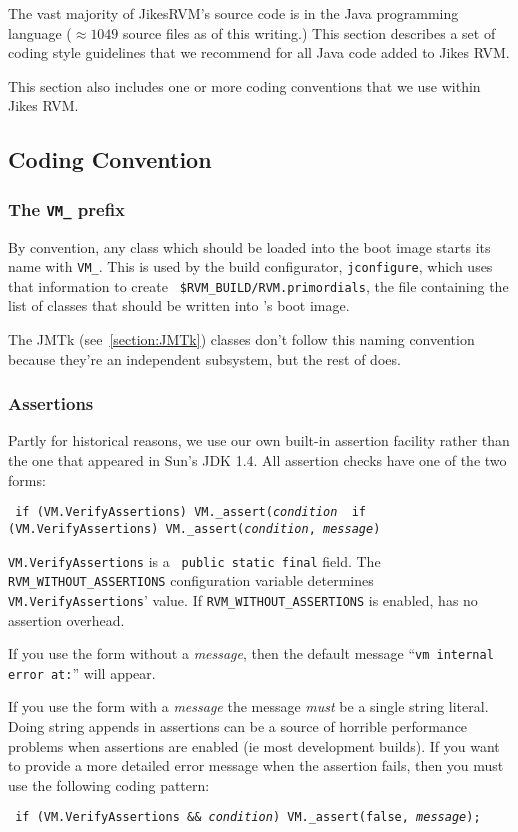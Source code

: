 The vast majority of Jikes\TMweb RVM's source code is in the Java\TMweb
programming language ($\approx 1049$
source files as of this writing.)  This section describes a set of
coding style guidelines that we recommend for all Java code added to
Jikes RVM.

This section also includes one or more coding conventions that we
use within Jikes RVM.  

\subsection{Coding Convention}

\subsubsection{The {\tt VM\_} prefix}

By convention, any class which should be loaded into the boot image
starts its name with {\tt VM\_}.  This is used by the build configurator,
{\tt jconfigure}, which uses that information to create {\tt
\$RVM\_BUILD/RVM.primordials}, the file containing the list of classes
that should be written into \jrvm{}'s  boot image.

The JMTk (see~\ref{section:JMTk}) classes don't follow this naming convention
because they're an independent subsystem, but the rest of \jrvm{} does.

\subsubsection{Assertions}
\label{assertions}

Partly for historical reasons, we use our own built-in assertion
facility rather than the one that appeared in Sun\Rweb{}'s JDK 1.4.   All
assertion checks have one of the two forms:
\begin{example}
\tt{}    if (VM.VerifyAssertions)  VM._assert({\it condition}
\tt{}    if (VM.VerifyAssertions)  VM._assert({\it condition}, {\it message})
\end{example}
{\tt VM.VerifyAssertions} is a {\tt 
public static final} field.  The {\tt RVM\_WITHOUT\_ASSERTIONS}
configuration variable determines {\tt VM.VerifyAssertions}' value.
If {\tt RVM\_WITHOUT\_ASSERTIONS} is enabled, \jrvm{} has no assertion
overhead. 

If you use the form without a {\it message}, then the default message
``{\tt vm internal error at:}''  will appear.  

If you use the form with a {\it message} the message {\em must} be a
single string literal.  Doing string appends in assertions can be a
source of horrible performance problems when assertions are enabled
(ie most development builds).  If you want to provide a
more detailed error message when the assertion fails, then you must
use the following coding pattern:
\begin{example}
\tt{}   if (VM.VerifyAssertions && {\it condition}) VM._assert(false, {\it message});
\end{example}

